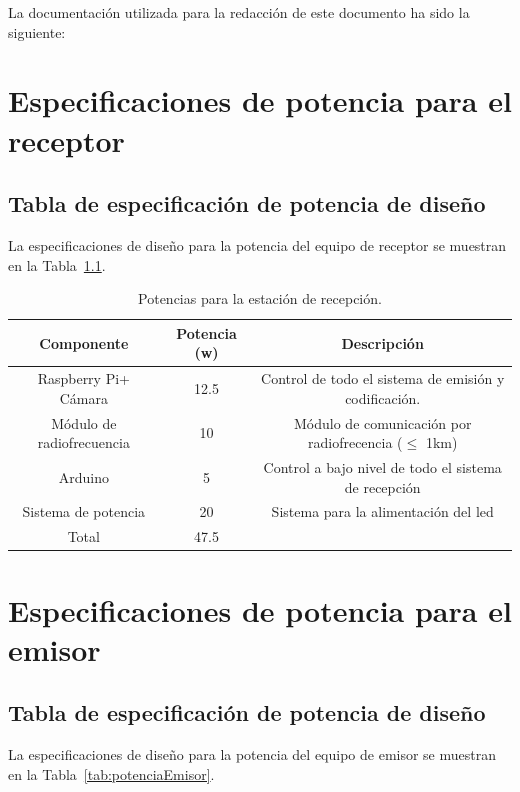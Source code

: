 \documentclass{scrreprt}
\begin{document}
La documentación utilizada para la redacción de este documento ha sido la siguiente:

\printbibliography[heading=none]

\chapter{Especificaciones de potencia para el receptor \label{ch:receptor}}

\section{Tabla de especificación de potencia de diseño}

La especificaciones de diseño para la potencia del equipo de receptor se muestran en la Tabla~\ref{tab:potenciaReceptor}.

\begin{table}[h!]
\begin{tabular}{|c|c|c|}
\hline 
\textbf{Componente} & \textbf{Potencia (w)} & \textbf{Descripción} \\ 
\hline 
Raspberry Pi+ Cámara & 12.5 & Control de todo el sistema de emisión y codificación. \\ 
\hline 
Módulo de radiofrecuencia & 10 & Módulo de comunicación por radiofrecencia ($\le$ 1km)  \\ 
\hline 
Arduino & 5 & Control a bajo nivel de todo el sistema de recepción \\ 
\hline 
Sistema de potencia & 20 & Sistema para la alimentación del led \\ 
\hline 
 Total & 47.5 &  \\ 
\hline 
\end{tabular} 
\caption{Potencias para la estación de recepción.}
\label{tab:potenciaReceptor}
\end{table}

\chapter{Especificaciones de potencia para el emisor \label{ch:emisor}}

\section{Tabla de especificación de potencia de diseño}

La especificaciones de diseño para la potencia del equipo de emisor se muestran en la Tabla~\ref{tab:potenciaEmisor}.
\end{document}
